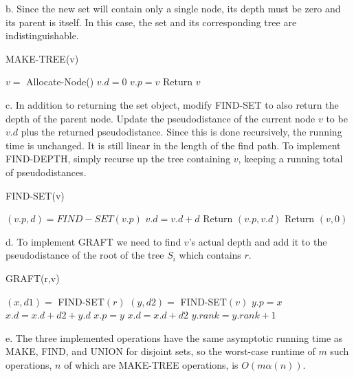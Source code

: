 \documentclass{article}
\begin{document}
b. Since the new set will contain only a single node, its depth must be zero and its parent is itself.  In this case, the set and its corresponding tree are indistinguishable.\\

\begin{algorithm}
\caption{MAKE-TREE(v)}
\begin{algorithmic}
\State $v = $ Allocate-Node()
\State $v.d = 0$
\State $v.p = v$
\State Return $v$
\end{algorithmic}
\end{algorithm}

c. In addition to returning the set object, modify FIND-SET to also return the depth of the parent node.  Update the pseudodistance of the current node $v$ to be $v.d$ plus the returned pseudodistance.  Since this is done recursively, the running time is unchanged.  It is still linear in the length of the find path. To implement FIND-DEPTH, simply recurse up the tree containing $v$, keeping a running total of pseudodistances.  \\

\begin{algorithm}
\caption{FIND-SET(v)}
\begin{algorithmic}
	\State $(v.p, d) = FIND-SET(v.p)$
	\State $v.d = v.d + d$
	\State Return $(v.p, v.d)$
\Else
	\State Return $(v, 0)$
\EndIf
\end{algorithmic}
\end{algorithm}

d. To implement GRAFT we need to find $v$'s actual depth and add it to the pseudodistance of the root of the tree $S_i$ which contains $r$. \\

\begin{algorithm}
\caption{GRAFT(r,v)}
\begin{algorithmic}
\State $(x,d1) = $ FIND-SET$(r)$
\State $(y,d2) = $ FIND-SET$(v)$
	\State $y.p = x$
	\State $x.d = x.d + d2 + y.d$
\Else
	\State $x.p = y$
	\State $x.d = x.d + d2$
		\State $y.rank = y.rank + 1$
	\EndIf
\EndIf
\end{algorithmic}
\end{algorithm}

e. The three implemented operations have the same asymptotic running time as MAKE, FIND, and UNION for disjoint sets, so the worst-case runtime of $m$ such operations, $n$ of which are MAKE-TREE operations, is $O(m \alpha(n))$.\\
\end{document}

